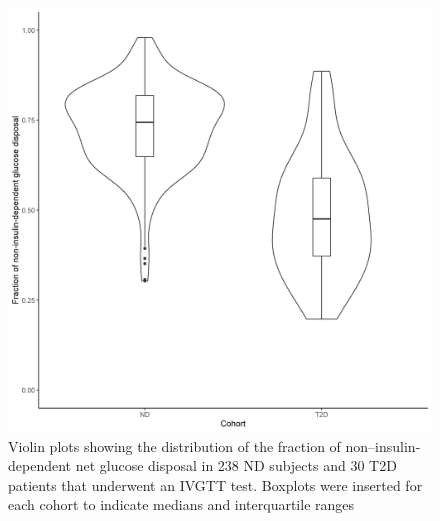 \documentclass[utf8]{frontiersSCNS} %
\begin{document}
\begin{figure}[h!]
\begin{center}
\includegraphics[width=15cm]{fig5.PNG}
\end{center}
\caption{Violin plots showing the distribution of the fraction of non–insulin-dependent net glucose disposal in 238 ND subjects and 30 T2D patients that underwent an IVGTT test. Boxplots were inserted for each cohort to indicate medians and interquartile ranges}
\label{fig: frac}
\end{figure}
\end{document}
